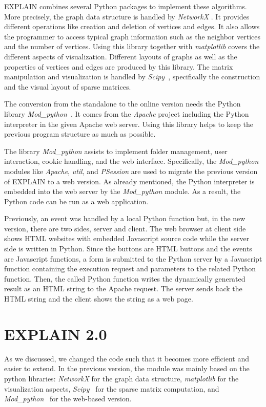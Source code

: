 \documentclass[12pt, oneside]{book}
\begin{document}
\mbox{EXPLAIN} combines several Python packages to implement these algorithms. More precisely, the graph data structure is handled by \textit{NetworkX} \cite{networkx2008}. It provides different operations like creation and deletion of vertices and edges. It also allows the programmer to access typical graph information such as the neighbor vertices and the number of vertices. Using this library together with  \textit{matplotlib} \cite{matplotlib2007} covers the different aspects of visualization. Different layouts of graphs as well as the properties of vertices and edges are produced by this library. The matrix manipulation and visualization is handled by \textit{Scipy}~\cite{scipy2001}, specifically the construction and the visual layout of sparse matrices.

The conversion from the standalone to the online version needs the Python library \textit{Mod\_python}~\cite{modpython2013}. It comes from the \textit{Apache} project including the Python interpreter in the given Apache web server. Using this library helps to keep the previous program structure as much as possible.

The library \textit{Mod\_python} assists to implement folder management, user interaction, cookie handling, and the web interface. Specifically, the \textit{Mod\_python} modules like \textit{Apache}, \textit{util}, and \textit{PSession} are used to migrate the previous version of \mbox{EXPLAIN} to a web version. As already mentioned, the Python interpreter is embedded into the web server by the \textit{Mod\_python} module. As a result, the Python code can be run as a web application.

Previously, an event was handled by a local Python function but, in the new version, there are two sides, server and client. The web browser at client side shows HTML websites with embedded  Javascript source code while the server side is written in Python. Since the buttons are HTML buttons and the events are Javascript functions, a form is submitted to the Python server by a Javascript function containing the execution request and parameters to the related Python function. Then, the called Python function writes the dynamically generated result as an HTML string to the Apache request. The server sends back the HTML string and the client shows the string as a web page.

\section{EXPLAIN 2.0}
As we discussed, we changed the code such that it becomes more efficient and easier to extend. 
In the previous version, the module was mainly based on the python libraries:
\textit{NetworkX} \cite{networkx2008} for the graph data structure,
\textit{matplotlib} \cite{matplotlib2007} for the visualization aspects,
\textit{Scipy}~\cite{scipy2001} for the sparse matrix computation, and
\textit{Mod\_python}~\cite{modpython2013} for the web-based version. 
\end{document}
